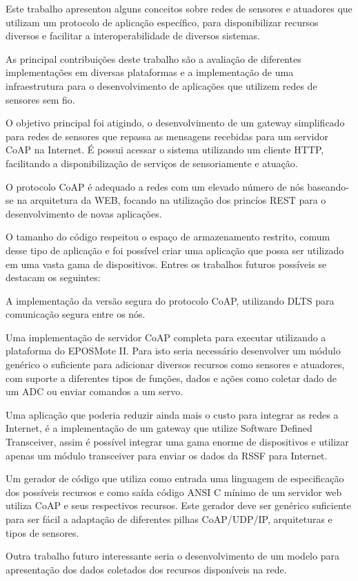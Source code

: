 Este trabalho apresentou alguns conceitos sobre redes de sensores e atuadores que utilizam um protocolo de aplica\c{c}\~ao espec\'ifico, para disponibilizar recursos diversos e facilitar a interoperabilidade de diversos sistemas.

As principal contribui\c{c}\~oes deste trabalho s\~ao a avalia\c{c}\~ao de diferentes implementa\c{c}\~oes em diversas plataformas e a implementa\c{c}\~ao de uma infraestrutura para o desenvolvimento de aplica\c{c}\~oes que utilizem redes de sensores sem fio.

O objetivo principal foi atigindo, o desenvolvimento de um gateway simplificado para redes de sensores que repassa as mensagens recebidas para um servidor CoAP na Internet. \'E possui acessar o sistema utilizando um cliente HTTP, facilitando a disponibiliza\c{c}\~ao de servi\c{c}os de sensoriamente e atua\c{c}\~ao.

O protocolo CoAP \'e adequado a redes com um elevado n\'umero de n\'os baseando-se na arquitetura da WEB, focando na utiliza\c{c}\~ao dos princ\'ios REST para o desenvolvimento de novas aplica\c{c}\~oes.

O tamanho do c\'odigo respeitou o espa\c{c}o de armazenamento restrito, comum desse tipo de aplica\c{c}\~ao e foi poss\'ivel criar uma aplica\c{c}\~ao que possa ser utilizado em uma vasta gama de dispositivos. Entres os trabalhos futuros poss\'iveis se destacam os seguintes:

A implementa\c{c}\~ao da vers\~ao segura do protocolo CoAP, utilizando DLTS para comunica\c{c}\~ao segura entre os n\'os.

Uma implementa\c{c}\~ao de servidor CoAP completa para executar utilizando a plataforma do EPOSMote II. Para isto seria necess\'ario desenvolver um m\'odulo gen\'erico o suficiente para adicionar diversos recursos como sensores e atuadores, com suporte a diferentes tipos de fun\c{c}\~oes, dados e a\c{c}\~oes como coletar dado de um ADC ou enviar comandos a um servo.

Uma aplica\c{c}\~ao que poderia reduzir ainda mais o custo para integrar as redes a Internet, \'e a implementa\c{c}\~ao de um gateway que utilize Software Defined Transceiver, assim \'e poss\'ivel integrar uma gama enorme de dispositivos e utilizar apenas um m\'odulo transceiver para enviar os dados da RSSF para Internet.

Um gerador de c\'odigo que utiliza como entrada uma linguagem de especifica\c{c}\~ao dos poss\'iveis recursos e como sa\'ida c\'odigo ANSI C m\'inimo de um servidor web utiliza CoAP e seus respectivos recursos. Este gerador deve ser gen\'erico suficiente para ser f\'acil a adapta\c{c}\~ao de diferentes pilhas CoAP/UDP/IP, arquiteturas e tipos de sensores.

Outra trabalho futuro interessante seria o desenvolvimento de um modelo para apresenta\c{c}\~ao dos dados coletados dos recursos dispon\'iveis na rede.
